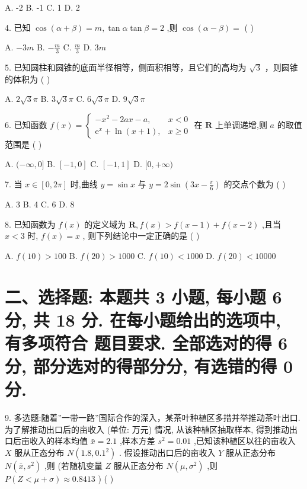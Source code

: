 \documentclass[10pt]{article}
\begin{document}
A. -2 B. -1 C. 1 D. 2

4. 已知 \(\cos \left( {\alpha  + \beta }\right)  = m,\tan \alpha \tan \beta  = 2\) ,则 \(\cos \left( {\alpha  - \beta }\right)  =\) ( )

A. \(- {3m}\) B. \(- \frac{m}{3}\) C. \(\frac{m}{3}\) D. \({3m}\)

5. 已知圆柱和圆锥的底面半径相等，侧面积相等，且它们的高均为 \(\sqrt{3}\) ，则圆锥的体积为 ( )

A. \(2\sqrt{3}\pi\) B. \(3\sqrt{3}\pi\) C. \(6\sqrt{3}\pi\) D. \(9\sqrt{3}\pi\)

6. 已知函数 \(f\left( x\right)  = \left\{  \begin{matrix}  - {x}^{2} - {2ax} - a, & x < 0 \\  {\mathrm{e}}^{x} + \ln \left( {x + 1}\right) , & x \geq  0 \end{matrix}\right.\) 在 \(\mathbf{R}\) 上单调递增,则 \(a\) 的取值范围是 ( )

A. \(( - \infty ,0\rbrack\) B. \(\left\lbrack  {-1,0}\right\rbrack\) C. \(\left\lbrack  {-1,1}\right\rbrack\) D. \(\lbrack 0, + \infty )\)

7. 当 \(x \in  \left\lbrack  {0,{2\pi }}\right\rbrack\) 时,曲线 \(y = \sin x\) 与 \(y = 2\sin \left( {{3x} - \frac{\pi }{6}}\right)\) 的交点个数为 ( )

A. 3 B. 4 C. 6 D. 8

8. 已知函数为 \(f\left( x\right)\) 的定义域为 \(\mathbf{R},f\left( x\right)  > f\left( {x - 1}\right)  + f\left( {x - 2}\right)\) ,且当 \(x < 3\) 时, \(f\left( x\right)  = x\) , 则下列结论中一定正确的是 ( )

A. \(f\left( {10}\right)  > {100}\) B. \(f\left( {20}\right)  > {1000}\) C. \(f\left( {10}\right)  < {1000}\) D. \(f\left( {20}\right)  < {10000}\)

\section*{二、选择题: 本题共 3 小题, 每小题 6 分, 共 18 分. 在每小题给出的选项中, 有多项符合 题目要求. 全部选对的得 6 分, 部分选对的得部分分, 有选错的得 0 分.}

9. 多选题:随着”一带一路”国际合作的深入，某茶叶种植区多措并举推动茶叶出口. 为了解推动出口后的亩收入 (单位: 万元) 情况, 从该种植区抽取样本, 得到推动出口后亩收入的样本均值 \(\bar{x} = {2.1}\) ,样本方差 \({s}^{2} = {0.01}\) ,已知该种植区以往的亩收入 \(X\) 服从正态分布 \(N\left( {{1.8},{0.1}^{2}}\right)\) . 假设推动出口后的亩收入 \(Y\) 服从正态分布 \(N\left( {\bar{x},{s}^{2}}\right)\) ,则 (若随机变量 \(Z\) 服从正态分布 \(N\left( {\mu ,{\sigma }^{2}}\right)\) ,则 \(P\left( {Z < \mu  + \sigma }\right)  \approx  {0.8413}\) ) ( )
\end{document}
